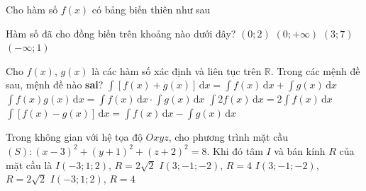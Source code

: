 \begin{ex}%
	Cho hàm số $f(x)$ có bảng biến thiên như sau
	\begin{center}
	\end{center}
	Hàm số đã cho đồng biến trên khoảng nào dưới đây?
	\choice
	{$(0;2)$}
	{$(0;+\infty)$}
	{\True $(3;7)$}
	{$(-\infty;1)$}
\end{ex}

\begin{ex}%
	Cho $f(x)$, $g(x)$ là các hàm số xác định và liên tục trên $\mathbb{R}$. Trong các mệnh đề sau, mệnh đề nào \textbf{sai}?
	\choice
	{$\displaystyle\int [f(x)+g(x)]\mathrm{\,d}x=\displaystyle\int f(x)\mathrm{\,d}x+\displaystyle\int g(x)\mathrm{\,d}x$}
	{\True $\displaystyle\int f(x)g(x)\mathrm{\,d}x=\displaystyle\int f(x)\mathrm{\,d}x\cdot \displaystyle\int g(x)\mathrm{\,d}x$}
	{$\displaystyle\int 2f(x)\mathrm{\,d}x=2\displaystyle\int f(x)\mathrm{\,d}x$}
	{$\displaystyle\int [f(x)-g(x)]\mathrm{\,d}x=\displaystyle\int f(x)\mathrm{\,d}x-\displaystyle\int g(x)\mathrm{\,d}x$}
\end{ex}

\begin{ex}%
	Trong không gian với hệ tọa độ $Oxyz$, cho phương trình mặt cầu $(S)\colon (x-3)^2+(y+1)^2+(z+2)^2=8$. Khi đó tâm $I$ và bán kính $R$ của mặt cầu là
	\choice
	{$I(-3;1;2)$, $R=2\sqrt{2}$}
	{$I(3;-1;-2)$, $R=4$}
	{\True $I(3;-1;-2)$, $R=2\sqrt{2}$}
	{$I(-3;1;2)$, $R=4$}
\end{ex}

